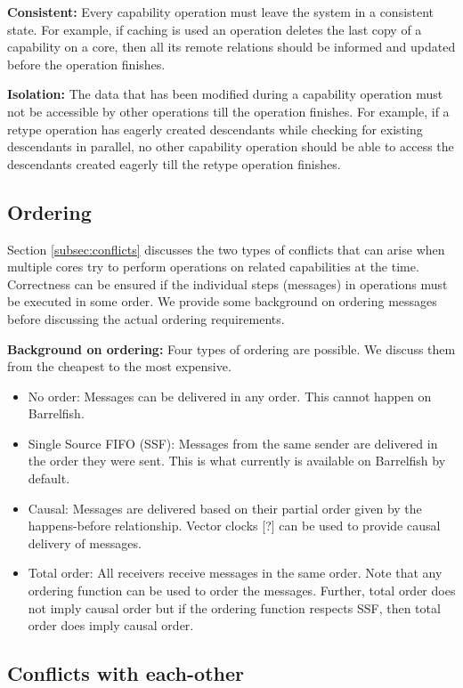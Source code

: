 \documentclass[a4paper,twoside]{report} %
\begin{document}
\textbf{Consistent:} Every capability operation must leave the system
in a consistent state. For example, if caching is used an operation
deletes the last copy of a capability on a core, then all its remote
relations should be informed and updated before the operation
finishes.

\textbf{Isolation:} The data that has been modified during a
capability operation must not be accessible by other operations till
the operation finishes. For example, if a retype operation has eagerly
created descendants while checking for existing descendants in
parallel, no other capability operation should be able to access the
descendants created eagerly till the retype operation finishes.

\subsection{Ordering}
Section \ref{subsec:conflicts} discusses the two types of conflicts
that can arise when multiple cores try to perform operations on
related capabilities at the time. Correctness can be ensured if the
individual steps (messages) in operations must be executed in some
order.  We provide some background on ordering messages before
discussing the actual ordering requirements.

\textbf{Background on ordering:} Four types of ordering are
possible. We discuss them from the cheapest to the most expensive.

\begin{itemize}
\item No order: Messages can be delivered in any order. This cannot
  happen on Barrelfish.
\item Single Source FIFO (SSF): Messages from the same sender are
  delivered in the order they were sent. This is what currently is
  available on Barrelfish by default.
\item Causal: Messages are delivered based on their partial order
  given by the happens-before relationship. Vector clocks [?] can be
  used to provide causal delivery of messages.
\item Total order: All receivers receive messages in the same
  order. Note that any ordering function can be used to order the
  messages. Further, total order does not imply causal order but if
  the ordering function respects SSF, then total order does imply
  causal order.
\end{itemize}

\subsection{Conflicts with each-other}
\end{document}

